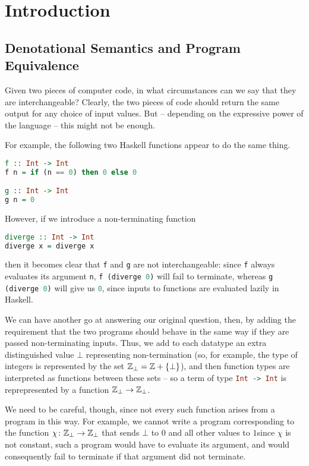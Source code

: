 \documentclass[11pt]{report}
\begin{document}
\chapter{Introduction}

\section{Denotational Semantics and Program Equivalence}

Given two pieces of computer code, in what circumstances can we say that they are interchangeable?
Clearly, the two pieces of code should return the same output for any choice of input values. 
But -- depending on the expressive power of the language -- this might not be enough.

For example, the following two Haskell functions appear to do the same thing.

\begin{lstlisting}[language=haskell]
f :: Int -> Int
f n = if (n == 0) then 0 else 0

g :: Int -> Int
g n = 0
\end{lstlisting}

However, if we introduce a non-terminating function
\begin{lstlisting}[language=haskell]
diverge :: Int -> Int
diverge x = diverge x
\end{lstlisting}
then it becomes clear that \lstinline[language=haskell]{f} and \lstinline[language=haskell]{g} are not interchangeable: since \lstinline[language=haskell]{f} always evaluates its argument \lstinline[language=haskell]{n}, \lstinline[language=haskell]{f (diverge 0)} will fail to terminate, whereas \lstinline[language=haskell]{g (diverge 0)} will give us \lstinline[language=haskell]{0}, since inputs to functions are evaluated lazily in Haskell.

We can have another go at answering our original question, then, by adding the requirement that the two programs should behave in the same way if they are passed non-terminating inputs.
Thus, we add to each datatype an extra distinguished value $\bot$ representing non-termination (so, for example, the type of integers is represented by the set $\mathbb{Z}_\bot = \mathbb{Z} + \{\bot\}$), and then function types are interpreted as functions between these sets -- so a term of type \lstinline[language=haskell]{Int -> Int} is reprepresented by a function $\mathbb{Z}_\bot \to \mathbb{Z}_\bot$.

We need to be careful, though, since not every such function arises from a program in this way.
For example, we cannot write a program corresponding to the function $\chi\colon\mathbb{Z}_\bot \to \mathbb{Z}_\bot$ that sends $\bot$ to $0$ and all other values to $1$since $\chi$ is not constant, such a program would have to evaluate its argument, and would consequently fail to terminate if that argument did not terminate.
\end{document}
